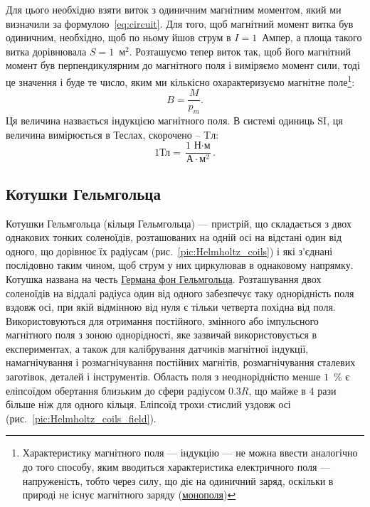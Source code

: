 \documentclass{LabWork}
\begin{document}
Для цього необхідно взяти виток з одиничним магнітним моментом, який ми визначили за формулою~\eqref{eq:circuit}. Для  того, щоб магнітний момент витка був одиничним, необхідно, щоб по ньому йшов струм в $I = 1$~Ампер, а площа такого витка дорівнювала $S = 1$~м$^2$. Розташуємо тепер виток так, щоб його магнітний момент був перпендикулярним до магнітного поля і виміряємо момент сили, тоді це значення і буде те число, яким ми кількісно охарактеризуємо магнітне поле\footnote{Характеристику магнітного поля --- індукцію --- не можна ввести аналогічно до того способу, яким вводиться характеристика електричного поля --- напруженість, тобто через силу, що діє на одиничний заряд, оскільки в природі не існує магнітного заряду (\href{https://en.wikipedia.org/wiki/Magnetic_monopole}{монополя}) }:
\begin{equation}\label{B}
	B = \frac{M}{p_m}.
\end{equation}
Ця величина назвається індукцією магнітного поля. В системі одиниць SI, ця величина вимірюється в Теслах, скорочено -- Tл:
\begin{equation}
	1 \text{Тл} = \frac{\text{1 Н}\cdot\text{м}}{\text{А}\cdot\text{м}^2}.
\end{equation}


\subsection{Котушки Гельмгольца}

Котушки Гельмгольца (кільця Гельмгольца) --- пристрій, що складається з двох однакових тонких соленоїдів, розташованих на одній осі на відстані один від одного, що дорівнює їх радіусам (рис.~\ref{pic:Helmholtz_coils}) і які з'єднані послідовно таким чином, щоб струм у них циркулював в однаковому напрямку. Котушка названа на честь \href{https://en.wikipedia.org/wiki/Hermann_von_Helmholtz}{Германа фон Гельмгольца}. Розташування двох соленоїдів на віддалі радіуса один від одного забезпечує таку однорідність поля вздовж осі, при якій відмінною від нуля є тільки четверта похідна від поля. Використовуються для отримання постійного, змінного або імпульсного магнітного поля з зоною однорідності, яке зазвичай використовується в експериментах, а також для калібрування датчиків магнітної індукції, намагнічування і розмагнічування постійних магнітів, розмагнічування сталевих заготівок, деталей і інструментів. Область поля з неоднорідністю менше $1$~\% є еліпсоїдом обертання близьким до сфери радіусом $0.3R$, що майже в $4$ рази більше ніж для одного кільця. Еліпсоїд трохи стислий уздовж осі (рис.~\ref{pic:Helmholtz_coils_field}).
\end{document}
